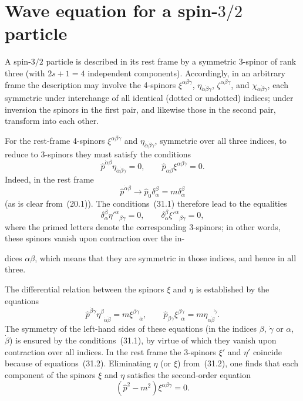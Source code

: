 \section{Wave equation for a spin-\texorpdfstring{$3/2$}{3/2} particle}

A spin-$3/2$ particle is described in its rest frame by a symmetric 3-spinor of rank three (with $2s + 1 = 4$ independent components). Accordingly, in an arbitrary frame the description may involve the 4-spinors $\xi^{\alpha\beta\dot\gamma}$, $\eta_{\dot\alpha\dot\beta\gamma}$, $\zeta^{\alpha\beta\gamma}$, and $\chi_{\dot\alpha\dot\beta\dot\gamma}$, each symmetric under interchange of all identical (dotted or undotted) indices; under inversion the spinors in the first pair, and likewise those in the second pair, transform into each other.

For the rest-frame 4-spinors $\xi^{\alpha\beta\dot\gamma}$ and $\eta_{\dot\alpha\dot\beta\gamma}$, symmetric over all three indices, to reduce to 3-spinors they must satisfy the conditions
\begin{equation}
\widehat p^{\dot\alpha\beta}\eta_{\dot\alpha\dot\beta\gamma} = 0,\qquad \widehat p_{\alpha\dot\beta}\xi^{\alpha\beta\dot\gamma} = 0.
\tag{31.1}
\end{equation}
Indeed, in the rest frame
\[
\widehat p^{\dot\alpha\beta} \to \widehat p_0\delta^\beta_\alpha = m\delta^\beta_\alpha
\]
(as is clear from~(20.1)). The conditions~(31.1) therefore lead to the equalities
\[
\delta^\beta_\alpha\eta'^{\alpha}{}_{\beta\gamma} = 0,\qquad \delta^\beta_\alpha\xi'^{\alpha}{}_{\beta\gamma} = 0,
\]
where the primed letters denote the corresponding 3-spinors; in other words, these spinors vanish upon contraction over the in-

dices $\alpha\beta$, which means that they are symmetric in those indices, and hence in all three.

The differential relation between the spinors $\xi$ and $\eta$ is established by the equations
\begin{equation}
\widehat p^{\dot\beta\gamma}\eta^{\beta}_{\;\;\dot\alpha\dot\beta} = m\xi^{\beta\gamma}_{\;\;\;\;\dot\alpha},\qquad \widehat p_{\dot\beta\gamma}\xi^{\beta\dot\gamma}_{\;\;\alpha} = m\eta_{\alpha\dot\beta}^{\;\;\;\;\dot\gamma}.
\tag{31.2}
\end{equation}
The symmetry of the left-hand sides of these equations (in the indices $\beta$, $\dot\gamma$ or $\alpha$, $\dot\beta$) is ensured by the conditions~(31.1), by virtue of which they vanish upon contraction over all indices. In the rest frame the 3-spinors $\xi'$ and $\eta'$ coincide because of equations~(31.2). Eliminating $\eta$ (or $\xi$) from~(31.2), one finds that each component of the spinors $\xi$ and $\eta$ satisfies the second-order equation
\begin{equation}
(\widehat p^2 - m^2)\xi^{\alpha\beta\dot\gamma} = 0.
\tag{31.3}
\end{equation}

